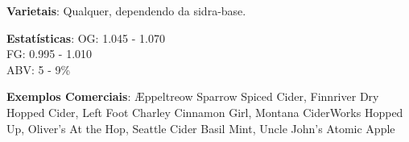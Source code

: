 \textbf{Varietais}: Qualquer, dependendo da sidra-base.

\textbf{Estatísticas}: OG: 1.045 - 1.070 \\
\phantom{ } \hspace{16.5mm} FG: 0.995 - 1.010 \\
\phantom{ } \hspace{16.5mm} ABV: 5 - 9\%

\textbf{Exemplos Comerciais}: Æppeltreow Sparrow Spiced Cider, Finnriver Dry Hopped Cider, Left Foot Charley Cinnamon Girl, Montana CiderWorks Hopped Up, Oliver's At the Hop, Seattle Cider Basil Mint, Uncle John's Atomic Apple
